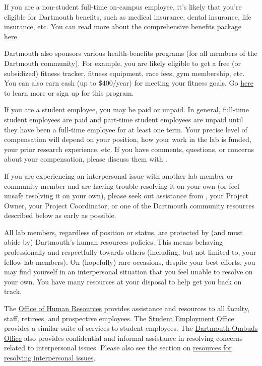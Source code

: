 \documentclass{tufte-book} %
\begin{document}

If you are a non-student full-time on-campus employee, it's likely that
you're eligible for Dartmouth benefits, such as medical insurance,
dental insurance, life insurance, etc.  You can read more about the
comprehensive benefits package \href{http://www.dartmouth.edu/~hrs/benefits/}{here}.

Dartmouth also sponsors various health-benefits programs (for all
members of the Dartmouth community).  For example, you are likely
eligible to get a free (or subsidized) fitness tracker, fitness
equipment, race fees, gym membership, etc.  You can also earn cash (up
to \$400/year) for meeting your fitness goals.  Go
\href{http://join.virginpulse.com/dartmouth/}{here} to learn more or
sign up for this program.

If you are a student employee, you may be paid or unpaid.  In general,
full-time student employees are paid and part-time student employees
are unpaid until they have been a full-time employee for at least one
term.  Your precise level of compensation will depend on your
position, how your work in the lab is funded, your prior research
experience, etc.  If you have comments, questions, or concerns about
your compensation, please discuss them with \director.


If you are experiencing an interpersonal issue with another lab member
or community member and are having trouble resolving it on your own (or feel
unsafe resolving it on your own), please seek out assistance from
\director, your Project Owner, your Project Coordinator,
or one of the Dartmouth community resources described below as early
as possible.

All lab members, regardless of position or status, are protected by
(and must abide by) Dartmouth's human resources policies.  This means
behaving professionally and respectfully towards others (including,
but not limited to, your fellow lab members).  On (hopefully) rare
occasions, despite your best efforts, you may find yourself in an
interpersonal situation that you feel unable to resolve on your own.
You have many resources at your disposal to help get you back on
track.

The \href{http://www.dartmouth.edu/~hrs/}{Office of Human Resources}
provides assistance and resources to all faculty, staff, retirees, and
prospective employees. The
\href{http://www.dartmouth.edu/~seo/}{Student Employment Office}
provides a similar suite of services to student employees.  The
\href{http://www.dartmouth.edu/~ombuds/}{Dartmouth Ombuds Office} also
provides confidential and informal assistance in resolving concerns
related to interpersonal issues.  Please also see the section on
\hyperref[sec:interpersonal]{resources for resolving interpersonal issues}.
\end{document}

